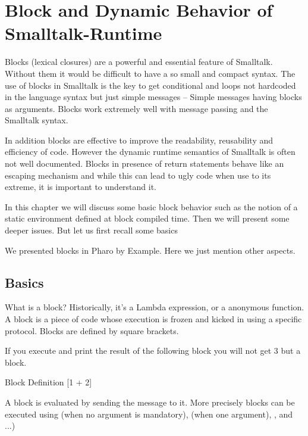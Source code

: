 \documentclass[a4paper,10pt,twoside]{book}
\begin{document}
\fi
\sloppy
\chapter{Block and Dynamic Behavior of Smalltalk-Runtime}

Blocks (lexical closures) are a powerful and essential feature of Smalltalk. Without them it
would be difficult to have a so small and compact syntax. The use of blocks in Smalltalk
is the key to get conditional and loops not hardcoded in the language syntax but just 
simple messages -- Simple messages having blocks as arguments. Blocks work extremely well with message passing and the Smalltalk syntax. 

In addition blocks are  effective to improve the readability, reusability and efficiency of code. 
However the dynamic runtime semantics of Smalltalk is often not well documented. Blocks in presence of
return statements behave like an escaping mechanism and while this can lead to ugly code when use to its extreme, it is important to understand it. 

In this chapter we will discuss some basic block behavior such as the notion of a static environment 
defined at block compiled time. Then we will present some deeper issues. But let us first recall some basics


We presented blocks in Pharo by Example. Here we just mention other aspects. 

\section{Basics}
What is a block? Historically, it's a Lambda expression, or a anonymous function. A block is a piece of code whose execution is frozen and kicked in using a specific protocol.  Blocks are defined by square brackets.

If you execute and print the result of the following block you will not get 3 but a block. 
\begin{code}{Block Definition}
[1 + 2]
\end{code}

 A block is evaluated by sending the  message to it. More precisely blocks can be executed using  (when no argument is mandatory),  (when one argument), ,  and ...)
\end{document}
